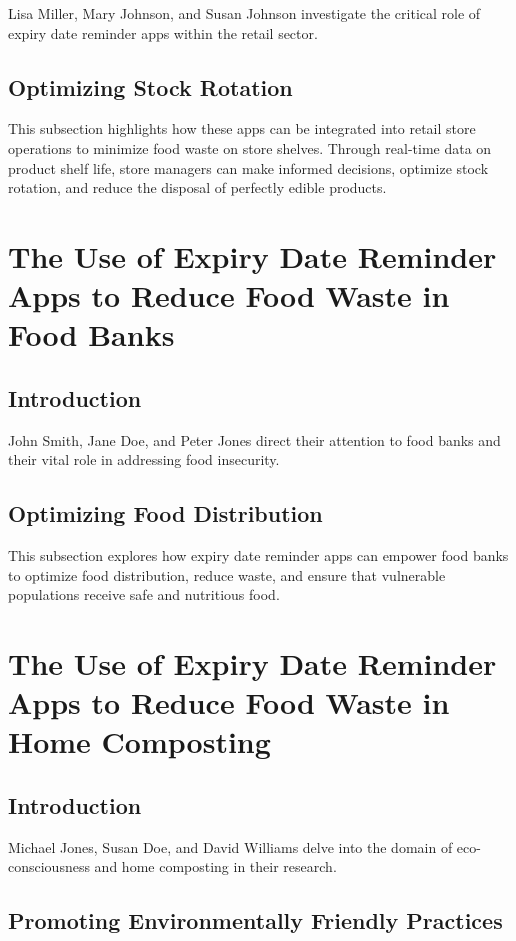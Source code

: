 Lisa Miller, Mary Johnson, and Susan Johnson investigate the critical role of expiry date reminder apps within the retail sector.

\subsection{Optimizing Stock Rotation}

This subsection highlights how these apps can be integrated into retail store operations to minimize food waste on store shelves. Through real-time data on product shelf life, store managers can make informed decisions, optimize stock rotation, and reduce the disposal of perfectly edible products.

\section{The Use of Expiry Date Reminder Apps to Reduce Food Waste in Food Banks}

\subsection{Introduction}

John Smith, Jane Doe, and Peter Jones direct their attention to food banks and their vital role in addressing food insecurity.

\subsection{Optimizing Food Distribution}

This subsection explores how expiry date reminder apps can empower food banks to optimize food distribution, reduce waste, and ensure that vulnerable populations receive safe and nutritious food.

\section{The Use of Expiry Date Reminder Apps to Reduce Food Waste in Home Composting}

\subsection{Introduction}

Michael Jones, Susan Doe, and David Williams delve into the domain of eco-consciousness and home composting in their research.

\subsection{Promoting Environmentally Friendly Practices}

